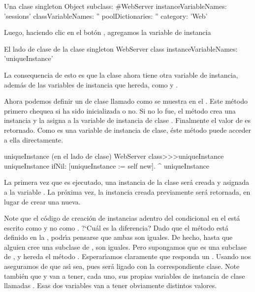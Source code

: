 \documentclass[a4paper,10pt,twoside]{book}
\begin{document}
\begin{classdef}[singleton]{Una clase singleton}
Object subclass: #WebServer
	instanceVariableNames: 'sessions' 	
	classVariableNames: '' 	
	poolDictionaries: '' 	
	category: 'Web'
\end{classdef}

Luego, haciendo clic en el bot\'on , agregamos la variable de instancia  

\begin{classdef}[webserver]{El lado de clase de la clase singleton}
WebServer class 	
	instanceVariableNames: 'uniqueInstance'
\end{classdef}

La consequencia de esto es que la clase  ahora tiene otra variable de instancia, 
adem\'as de las variables de instancia que hereda, como  y .


Ahora podemos definir un  de clase llamado  como se muestra en el .
Este m\'etodo primero chequea si   ha sido inicializada o no.
Si no lo fue, el m\'etodo crea una instancia y la asigna a la variable de instancia de clase  .  
Finalmente el valor de  es retornado.
Como   es una variable de instancia de clase, \'este m\'etodo puede acceder a ella directamente. 

    
\begin{method}[uniqueInstance]{uniqueInstance (en el lado de clase)}
WebServer class>>>uniqueInstance
     uniqueInstance ifNil: [uniqueInstance := self new].
     ^ uniqueInstance
\end{method}

La primera vez que  es ejecutado, una instancia de la clase   ser\'a creada y asignada a la variable .
La pr\'oxima vez, la instancia creada previamente ser\'a retornada, en lugar de crear una nueva. 


Note que el c\'odigo de creaci\'on de instancias adentro del condicional en el  est\'a escrito como   y no como .
?`Cu\'al es la diferencia?   Dado que el m\'etodo  est\'a definido en la , podr\'\i{}a pensarse que ambas son iguales. De hecho, hasta que alguien cree una subclase de , son iguales. Pero supongamos que  es una subclase de  , y hereda el m\'etodo . Esperar\'\i{}amos claramente que  responda un . Usando \self nos aseguramos de que as\'\i{} sea, pues ser\'a ligado con la correspondiente clase. 
Note tambi\'en que  y  van a tener, cada uno, sus propias variables de instancia de clase llamadas
.  Esas dos variables van a tener obviamente distintos valores.
\end{document}

